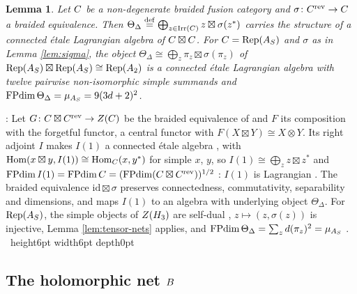 \documentclass[leqno]{article}
\let\cal\relax
\newcommand{\cal}{\mathcal}
\newcommand{\qed}{\hfill \vrule height6pt  width6pt depth0pt}
\newcommand{\co}{\colon}
\newcommand{\ot}{\otimes}
\newcommand{\ov}{\overset}
\DeclareMathOperator{\Irr}{Irr}
\DeclareMathOperator{\Rep}{Rep}
\newtheorem{lemma}[thm]{Lemma}
\newenvironment{proof}[1][]{\noindent {\it Proof #1} : }{\hbox{~}\qed
\smallskip
}
\numberwithin{equation}{section}
\begin{document}
\begin{lemma}
\label{lem:theta-delta}
Let $\cal C$ be a non-degenerate braided fusion category and $\sigma \co \cal C^{\mathrm{rev}} \to \cal C$ a braided equivalence. Then $\Theta_\Delta \ov{\mathrm{def}}{=} \bigoplus_{z \in \Irr(\cal C)} z \boxtimes \sigma(z^*)$ carries the structure of a connected étale Lagrangian algebra of $\cal C \boxtimes \cal C$. For $\cal C = \Rep(\cal A_S)$ and $\sigma$ as in Lemma \ref{lem:sigma}, the object $\Theta_\Delta \cong \bigoplus_z \pi_z \boxtimes \sigma(\pi_z)$ of $\Rep(\cal A_S) \boxtimes \Rep(\cal A_S) \cong \Rep(\cal A_2)$ is a connected étale Lagrangian algebra with twelve pairwise non-isomorphic simple summands and $\operatorname{FPdim}\Theta_\Delta = \mu_{\cal A_S} = 9(3d+2)^2$.
\end{lemma}

\begin{proof}
Let $G \co \cal C \boxtimes \cal C^{\mathrm{rev}} \to Z(\cal C)$ be the braided equivalence of \cite[(11) p.~5]{DMNO13} and $F$ its composition with the forgetful functor, a central functor with $F(X \boxtimes Y) \cong X \ot Y$. Its right adjoint $I$ makes $I(1)$ a connected étale algebra \cite[Lemma 3.5 p.~8]{DMNO13}, with $\operatorname{Hom}(x \boxtimes y,I(1)) \cong \operatorname{Hom}_{\cal C}(x,y^*)$ for simple $x$, $y$, so $I(1) \cong \bigoplus_z z \boxtimes z^*$ and $\operatorname{FPdim} I(1) = \operatorname{FPdim}\cal C = (\operatorname{FPdim}(\cal C \boxtimes \cal C^{\mathrm{rev}}))^{1/2}$ \cite[(8) p.~5]{DMNO13}: $I(1)$ is Lagrangian \cite[Definition 4.6 p.~17]{DMNO13}. The braided equivalence $\mathrm{id} \boxtimes \sigma$ preserves connectedness, commutativity, separability \cite[Remark 2.6(ii) p.~5]{DMNO13} and dimensions, and maps $I(1)$ to an algebra with underlying object $\Theta_\Delta$. For $\Rep(\cal A_S)$, the simple objects of $Z(\cal H_3)$ are self-dual \cite[Section 2.2]{ArhII}, $z \mapsto (z,\sigma(z))$ is injective, Lemma \ref{lem:tensor-nets} applies, and $\operatorname{FPdim}\Theta_\Delta = \sum_z d(\pi_z)^2 = \mu_{\cal A_S}$ \cite[Theorem 33 p.~24]{KLM01}.
\end{proof}


\subsection{The holomorphic net \texorpdfstring{$\cal B$}{B}}
\label{subsec:holomorphic-net}
\end{document}

